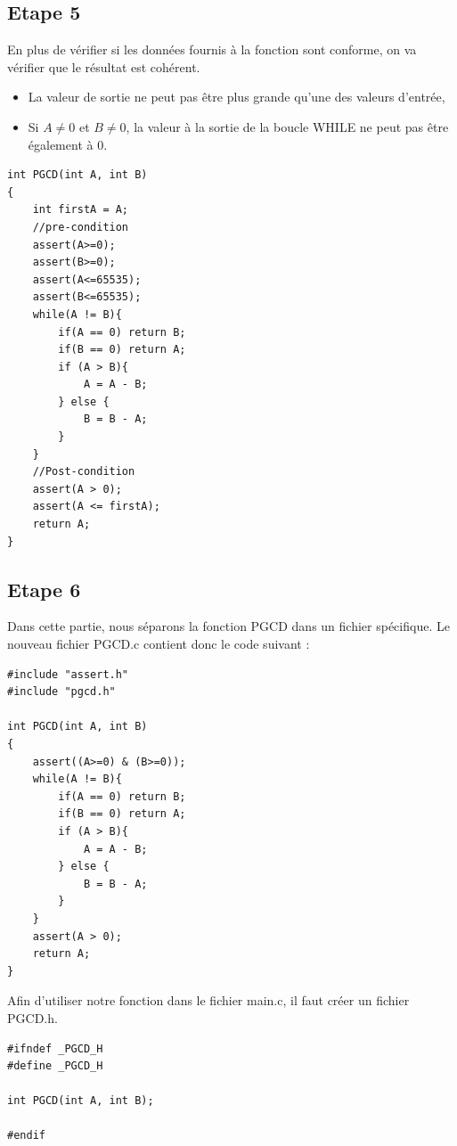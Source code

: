\documentclass[a4paper]{article}
\begin{document}
    \subsection{Etape 5}
        En plus de vérifier si les données fournis à la fonction sont conforme, on va vérifier que le résultat est cohérent.
        \begin{itemize}
            \item La valeur de sortie ne peut pas être plus grande qu'une des valeurs d'entrée,
            \item Si $A \neq 0$ et $B \neq 0$, la valeur à la sortie de la boucle WHILE ne peut pas être également à 0.
        \end{itemize}
\begin{lstlisting}[style=CStyle]
int PGCD(int A, int B)
{
	int firstA = A;
    //pre-condition
	assert(A>=0);
	assert(B>=0);
	assert(A<=65535);
	assert(B<=65535);
	while(A != B){
		if(A == 0) return B;
		if(B == 0) return A;
		if (A > B){
			A = A - B;
		} else {
			B = B - A;
		}
	}
    //Post-condition
	assert(A > 0);
	assert(A <= firstA);
	return A;
}
\end{lstlisting}
        
    \subsection{Etape 6}
       Dans cette partie, nous séparons la fonction PGCD dans un fichier spécifique.
       Le nouveau fichier PGCD.c contient donc le code suivant :
\begin{lstlisting}[style=CStyle]
#include "assert.h"
#include "pgcd.h"

int PGCD(int A, int B)
{
    assert((A>=0) & (B>=0));
    while(A != B){
        if(A == 0) return B;
        if(B == 0) return A;
        if (A > B){
            A = A - B;
        } else {
            B = B - A;
        }
    }
    assert(A > 0);
    return A;
}    
\end{lstlisting}

        Afin d'utiliser notre fonction dans le fichier main.c, il faut créer un fichier PGCD.h.
\begin{lstlisting}[style=CStyle]
#ifndef _PGCD_H
#define _PGCD_H 

int PGCD(int A, int B);

#endif   
\end{lstlisting}
\end{document}
